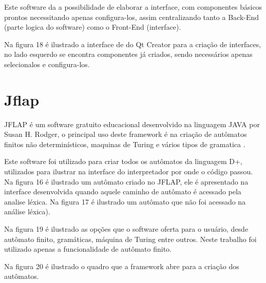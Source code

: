 \documentclass[12pt,oneside,a4paper,chapter=TITLE,section=TITLE,sumario=tradicional]{abntex2}
\begin{document}
Este software da a possibilidade de elaborar a interface, com componentes básicos prontos necessitando apenas configura-los, assim centralizando tanto a Back-End (parte logica do software) como o Front-End (interface). 

Na figura 18 é ilustrado a interface de do Qt Creator para a criação de interfaces, no lado esquerdo se encontra componentes já criados, sendo necessários apenas selecionalos e configura-los.

\begin{figure}[htb]
\end{figure} 

\section{Jflap}
\label{sec:jflap}

JFLAP é um software gratuito educacional desenvolvido na linguagem JAVA por Susan H. Rodger, o principal uso deste framework é na criação de autômatos finitos não determinísticos, maquinas de Turing e vários tipos de gramatica \cite{susan2005}.

Este software foi utilizado para criar todos os autômatos da linguagem D+, utilizados para ilustrar na interface do interpretador por onde o código passou. Na figura 16 é ilustrado um autômato criado no JFLAP, ele é apresentado na interface desenvolvida quando aquele caminho de autômato é acessado pela analise léxica. Na figura 17 é ilustrado um autômato que não foi acessado na análise léxica).

Na figura 19 é ilustrado as opções que o software oferta para o usuário, desde autômato finito, gramáticas, máquina de Turing entre outros. Neste trabalho foi utilizado apenas a funcionalidade de autômato finito.

\begin{figure}[htb]
\end{figure} 

Na figura 20 é ilustrado o quadro que a framework abre para a criação dos autômatos.

\begin{figure}[htb]
\end{figure}
\end{document}

